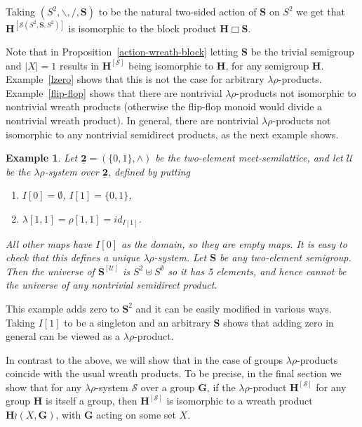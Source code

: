 \documentclass{amsart}
\newtheorem{example}{Example}
\def\ld{\mathbin{\backslash}}
\def\rd{\mathbin{/}}
\begin{document}
Taking $(S^2,\ld,\rd,\mathbf{S})$ to be the natural two-sided action
of $\mathbf{S}$ on $S^2$ we get that
$\mathbf{H}^{[\mathcal{S}(S^2,\mathbf{S},S^2)]}$ is isomorphic  
to the block product $\mathbf{H}\mathbin{\Box}\mathbf{S}$.


Note that in Proposition~\ref{action-wreath-block}
letting $\mathbf{S}$ be the trivial semigroup 
and $|X| = 1$ results in $\mathbf{H}^{[\mathcal{S}]}$
being isomorphic to $\mathbf{H}$, for any semigroup
$\mathbf{H}$. Example~\ref{lzero} shows that this is not the case 
for arbitrary $\lambda\rho$-products. Example~\ref{flip-flop} shows that there
are nontrivial $\lambda\rho$-products not isomorphic to nontrivial wreath
products (otherwise the flip-flop monoid would divide a nontrivial wreath product).
In general, there are nontrivial $\lambda\rho$-products not isomorphic to any
nontrivial semidirect products, as the next example shows.

\begin{example}\label{not-semidir-example}
Let $\underline{\mathbf{2}}=(\{0,1\},\wedge)$ be the two-element
meet-semilattice, and let 
$\mathcal{U}$ be the $\lambda\rho$-system over $\underline{\mathbf{2}}$, defined
by putting 
\begin{enumerate}
\item $I[0]=\emptyset$, $I[1]=\{0,1\}$,
\item $\lambda[1,1]=\rho[1,1]=id_{I[1]}$. 
\end{enumerate}
All other maps have $I[0]$ as the domain, so they are empty maps. It is easy to
check that this defines a unique $\lambda\rho$-system. Let $\mathbf{S}$ be any
two-element semigroup. Then the universe of $\mathbf{S}^{[\mathcal{U}]}$
is $S^2 \uplus S^\emptyset$ so it has 5 elements, and hence cannot be
the universe of any nontrivial semidirect product.
\end{example}
This example adds zero to $\mathbf{S}^2$ and it can be easily modified in various
ways. Taking $I[1]$ to be a singleton and an arbitrary $\mathbf{S}$ shows that
adding zero in general can be viewed as a $\lambda\rho$-product.

In contrast to the above, we will show that in the case of groups
$\lambda\rho$-products coincide with the usual wreath
products. To be precise, in the final section we show that for any $\lambda\rho$-system
$\mathcal{S}$ over a group $\mathbf{G}$, if the $\lambda\rho$-product
$\mathbf{H}^{[\mathcal{S}]}$ for any group $\mathbf{H}$ is itself a group, then
$\mathbf{H}^{[\mathcal{S}]}$ is isomorphic to a wreath product
$\mathbf{H}\wr (X,\mathbf{G})$, with $\mathbf{G}$ acting on some set $X$. 
\end{document}
